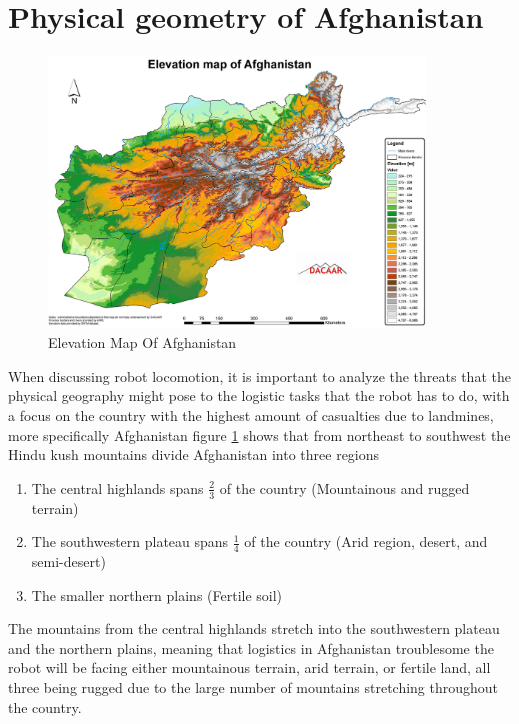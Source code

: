 \section{Physical geometry of Afghanistan}
\begin{figure}[!ht]
  \centering
  \includegraphics[width=10cm]{00 - Images/afghan-topography.png}
  \caption{Elevation Map Of Afghanistan \cite{afghan-topo}}
  \label{fig:af_elev}
\end{figure}

When discussing robot locomotion, it is important to analyze the threats that the physical geography might pose to the logistic tasks that the robot has to do, with a focus on the country with the highest amount of casualties due to landmines, more specifically Afghanistan figure \ref{fig:af_elev} shows that from northeast to southwest the Hindu kush mountains divide Afghanistan into three regions 

\begin{enumerate}
    \item The central highlands spans $\frac{2}{3}$ of the country (Mountainous and rugged terrain) 
    
    \vspace{-4mm}
    
    \item The southwestern plateau spans $\frac{1}{4}$ of the country (Arid region, desert, and semi-desert)
    
    \vspace{-4mm}
    
    \item The smaller northern plains (Fertile soil)
\end{enumerate}

The mountains from the central highlands stretch into the southwestern plateau and the northern plains, meaning that logistics in Afghanistan troublesome the robot will be facing either mountainous terrain, arid terrain, or fertile land, all three being rugged due to the large number of mountains stretching throughout the country. \cite{ellicott2003junior}

